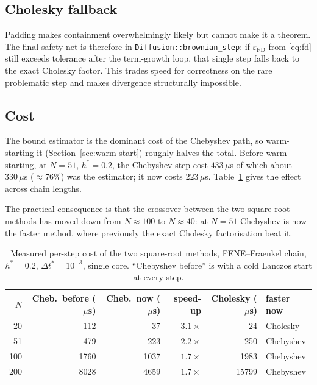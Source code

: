 \documentclass[11pt,a4paper]{report}
\newcommand{\dt}{\Delta t^{*}}
\newcommand{\code}[1]{\texttt{\seqsplitcode{#1}}}
\newcommand{\seqsplitcode}[1]{#1}
\begin{document}
\subsection{Cholesky fallback}

Padding makes containment overwhelmingly likely but cannot make it a theorem. The
final safety net is therefore in \code{Diffusion::brownian\_step}: if
$\varepsilon_{\mathrm{FD}}$ from \eqref{eq:fd} still exceeds tolerance after the
term-growth loop, that single step falls back to the exact Cholesky factor. This
trades speed for correctness on the rare problematic step and makes divergence
structurally impossible.

\subsection{Cost}

The bound estimator is the dominant cost of the Chebyshev path, so warm-starting
it (Section~\ref{sec:warm-start}) roughly halves the total. Before warm-starting,
at $N=51$, $h^{*}=0.2$, the Chebyshev step cost $433\,\mu$s of which about
$330\,\mu$s ($\approx76\%$) was the estimator; it now costs $223\,\mu$s.
Table~\ref{tab:hi-cost} gives the effect across chain lengths.

The practical consequence is that the crossover between the two square-root
methods has moved down from $N \approx 100$ to $N \approx 40$: at $N=51$
Chebyshev is now the faster method, where previously the exact Cholesky
factorisation beat it.

\begin{table}[ht]
\centering
\caption{Measured per-step cost of the two square-root methods, FENE--Fraenkel
chain, $h^{*}=0.2$, $\dt = 10^{-3}$, single core. ``Chebyshev before'' is with a
cold Lanczos start at every step.}
\label{tab:hi-cost}
\begin{tabular}{@{}rrrrrl@{}}
\toprule
$N$ & Cheb.\ before ($\mu$s) & Cheb.\ now ($\mu$s) & speed-up & Cholesky ($\mu$s) & faster now \\
\midrule
20  & 112  & 37   & $3.1\times$ & 24    & Cholesky \\
51  & 479  & 223  & $2.2\times$ & 250   & Chebyshev \\
100 & 1760 & 1037 & $1.7\times$ & 1983  & Chebyshev \\
200 & 8028 & 4659 & $1.7\times$ & 15799 & Chebyshev \\
\bottomrule
\end{tabular}
\end{table}
\end{document}
